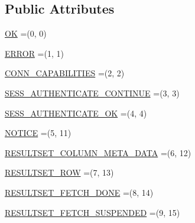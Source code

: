 \subsection*{Public Attributes}
\begin{DoxyCompactItemize}
\item 
\mbox{\hyperlink{enumcom_1_1mysql_1_1cj_1_1x_1_1protobuf_1_1_mysqlx_1_1_server_messages_1_1_type_a81d561a164e8414117a2befb2475dfcf}{OK}} =(0, 0)
\item 
\mbox{\hyperlink{enumcom_1_1mysql_1_1cj_1_1x_1_1protobuf_1_1_mysqlx_1_1_server_messages_1_1_type_a3fdcd1ae7b4dbbcfc825ab5b0b2a8029}{E\+R\+R\+OR}} =(1, 1)
\item 
\mbox{\hyperlink{enumcom_1_1mysql_1_1cj_1_1x_1_1protobuf_1_1_mysqlx_1_1_server_messages_1_1_type_ac66559d24e178970e502f2366d3da841}{C\+O\+N\+N\+\_\+\+C\+A\+P\+A\+B\+I\+L\+I\+T\+I\+ES}} =(2, 2)
\item 
\mbox{\hyperlink{enumcom_1_1mysql_1_1cj_1_1x_1_1protobuf_1_1_mysqlx_1_1_server_messages_1_1_type_af3ff7f540d85e8b9f94c5d23c920eebd}{S\+E\+S\+S\+\_\+\+A\+U\+T\+H\+E\+N\+T\+I\+C\+A\+T\+E\+\_\+\+C\+O\+N\+T\+I\+N\+UE}} =(3, 3)
\item 
\mbox{\hyperlink{enumcom_1_1mysql_1_1cj_1_1x_1_1protobuf_1_1_mysqlx_1_1_server_messages_1_1_type_ac29ba3a40386f73bf240bdddc228c293}{S\+E\+S\+S\+\_\+\+A\+U\+T\+H\+E\+N\+T\+I\+C\+A\+T\+E\+\_\+\+OK}} =(4, 4)
\item 
\mbox{\hyperlink{enumcom_1_1mysql_1_1cj_1_1x_1_1protobuf_1_1_mysqlx_1_1_server_messages_1_1_type_a27c7bf5927ad771b8fb2252c626189c9}{N\+O\+T\+I\+CE}} =(5, 11)
\item 
\mbox{\hyperlink{enumcom_1_1mysql_1_1cj_1_1x_1_1protobuf_1_1_mysqlx_1_1_server_messages_1_1_type_a2910684cc545a8046ff4b39fe80fe367}{R\+E\+S\+U\+L\+T\+S\+E\+T\+\_\+\+C\+O\+L\+U\+M\+N\+\_\+\+M\+E\+T\+A\+\_\+\+D\+A\+TA}} =(6, 12)
\item 
\mbox{\hyperlink{enumcom_1_1mysql_1_1cj_1_1x_1_1protobuf_1_1_mysqlx_1_1_server_messages_1_1_type_ab5d38fb74564dfc88ca4a26e37b00053}{R\+E\+S\+U\+L\+T\+S\+E\+T\+\_\+\+R\+OW}} =(7, 13)
\item 
\mbox{\hyperlink{enumcom_1_1mysql_1_1cj_1_1x_1_1protobuf_1_1_mysqlx_1_1_server_messages_1_1_type_a501190a6ba335553805f02dd63590b86}{R\+E\+S\+U\+L\+T\+S\+E\+T\+\_\+\+F\+E\+T\+C\+H\+\_\+\+D\+O\+NE}} =(8, 14)
\item 
\mbox{\hyperlink{enumcom_1_1mysql_1_1cj_1_1x_1_1protobuf_1_1_mysqlx_1_1_server_messages_1_1_type_ac4865e9d897c69751971937f8ba099c1}{R\+E\+S\+U\+L\+T\+S\+E\+T\+\_\+\+F\+E\+T\+C\+H\+\_\+\+S\+U\+S\+P\+E\+N\+D\+ED}} =(9, 15)

\end{DoxyCompactItemize}
